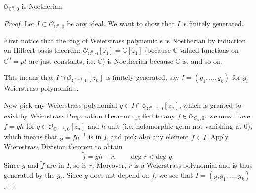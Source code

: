 \begin{proposition}
\label{proposition-stalk-is-noetherian}
$\mathcal{O}_{\mathbb{C}^n,0}$ is Noetherian.
\end{proposition}

\begin{proof}
Let $I \subset \mathcal{O}_{\mathbb{C}^n,0}$ be any ideal.
We want to show that $I$ is finitely generated.

First notice that the ring of Weierstrass polynomials is
Noetherian by induction on Hilbert basis theorem:
$\mathcal{O}_{\mathbb{C}^0,0}[z_1]=\mathbb{C}[z_1]$
(because $\mathbb{C}$-valued functions on $\mathbb{C}^0=pt$
are just constants, i.e. $\mathbb{C}$)
is Noetherian because $\mathbb{C}$ is,
and so on.

This means that $I \cap \mathcal{O}_{\mathbb{C}^{n-1},0}[z_n]$
is finitely generated, say $I=(g_1,…,g_k)$
for $g_i$ Weierstrass polynomials.

Now pick any Weierstrass polynomial
$g \in I \cap \mathcal{O}_{\mathbb{C}^{n-1},0}[z_n]$,
which is granted to exist by Weierstrass Preparation theorem
applied to any $f \in \mathcal{O}_{C_n,0}$:
we must have $f=gh$ for $g \in \mathcal{O}_{\mathbb{C}^{n-1},0}[z_n]$
and $h$ unit (i.e. holomorphic germ not vanishing at $0$),
which means that $g=fh^{-1}$ is in $I$,
and pick also any element $\tilde{f} \in I$.
Apply Wierestrass Division theorem to obtain
$$
\tilde{f}=gh+r,\qquad \text{deg }r < \text{deg }g.
$$
Since $g$ and $\tilde{f}$ are in $I$, so is $r$.
Moreover, $r$ is a Weierstrass polynomial and is thus generated
by the $g_i$. Since $g$ does not depend on $\tilde{f}$,
we see that $I=(g,g_1,…,g_k)$.
\end{proof}





